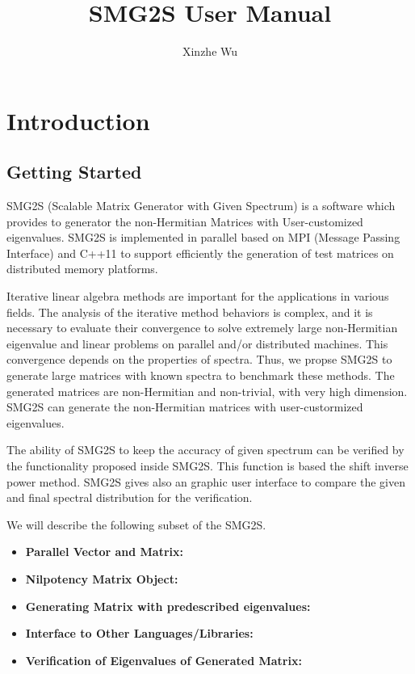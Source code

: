 \documentclass[letterpaper, 10 pt]{report}
\begin{document}
	\title{SMG2S User Manual}
	\author{Xinzhe Wu}
	\maketitle
	\pagestyle{empty}
	
	\tableofcontents
	\newpage
	\thispagestyle{empty}
	\mbox{}
	
	\chapter{Introduction}
	
	\section{Getting Started}
	SMG2S (Scalable Matrix Generator with Given Spectrum) is a software which provides to generator the non-Hermitian Matrices with User-customized eigenvalues. SMG2S is implemented in parallel based on MPI (Message Passing Interface) and C++11 to support efficiently the generation of test matrices on distributed memory platforms.

	Iterative linear algebra methods are important for the applications in various fields. The analysis of the iterative method behaviors is complex, and it is necessary to evaluate their convergence to solve extremely large non-Hermitian eigenvalue and linear problems on parallel and/or distributed machines. This convergence depends on the properties of spectra. Thus, we propse SMG2S to generate large matrices with known spectra to benchmark these methods. The generated matrices are non-Hermitian and non-trivial, with very high dimension. SMG2S can generate the non-Hermitian matrices with user-custormized eigenvalues. 
	
	The ability of SMG2S to keep the accuracy of given spectrum can be verified by the functionality proposed inside SMG2S. This function is based the shift inverse power method. SMG2S gives also an graphic user interface to compare the given and final spectral distribution for the verification.

	We will describe the following subset of the SMG2S.
	\begin{itemize}
		\item \textbf{Parallel Vector and Matrix:}
		\item \textbf{Nilpotency Matrix Object:}
		\item \textbf{Generating Matrix with predescribed eigenvalues:}
		\item \textbf{Interface to Other Languages/Libraries:}
		\item \textbf{Verification of Eigenvalues of Generated Matrix:}
	\end{itemize}
\end{document}
